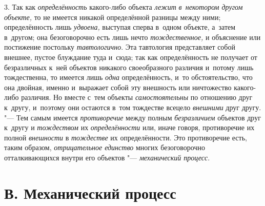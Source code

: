 3. Так как {\em определённость} какого-либо объекта {\em лежит}
{\em в~некотором другом объекте,}
то не имеется никакой определённой разницы между ними;
определённость лишь {\em удвоена,}
выступая сперва в~одном объекте, а~затем в~другом; она
безоговорочно есть лишь нечто {\em тождественное,} и
объяснение или постижение постольку {\em тавтологично}. Эта
тавтология представляет собой внешнее, пустое блуждание туда и~сюда; так
как определённость не получает от безразличных к~ней объектов никакого
своеобразного различия и~потому лишь тождественна, то имеется лишь {\em одна}
определённость, и~то обстоятельство, что она двойная, именно
и~выражает собой эту внешность или ничтожество какого-либо различия. Но
вместе с~тем объекты {\em самостоятельны} по
отношению друг к~другу, и~поэтому они остаются в~том тождестве всецело
{\em внешними} друг другу. "--- Тем самым имеется {\em противоречие} между
полным {\em безразличием} объектов друг к~другу и {\em тождеством} их
{\em определённости} или, иначе говоря, противоречие их полной
{\em внешности} в {\em тождестве} их определённости. Это противоречие есть,
таким образом, {\em отрицательное единство} многих безоговорочно
отталкивающихся внутри его объектов "--- {\em механический процесс}.

\section[В. Механический процесс]{В. Механический процесс}

